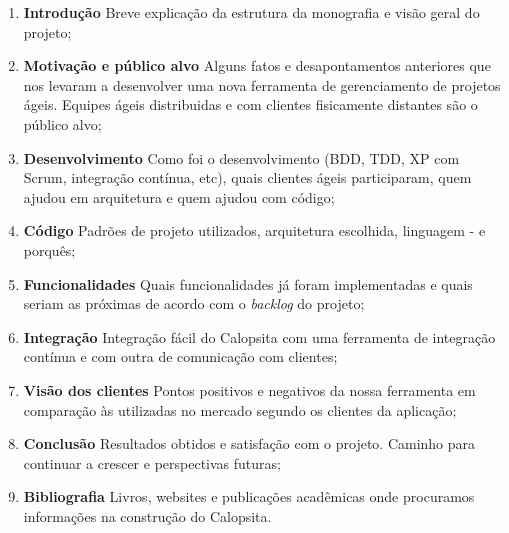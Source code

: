 \documentclass[titlepage]{article}
\begin{document}
\begin{enumerate}
	\item{\textbf{Introdução} Breve explicação da estrutura da monografia e visão geral do projeto;}
	\item{\textbf{Motivação e público alvo} Alguns fatos e desapontamentos anteriores que nos levaram a desenvolver uma nova ferramenta de gerenciamento de projetos ágeis. Equipes ágeis distribuidas e com clientes fisicamente distantes são o público alvo;}
	\item{\textbf{Desenvolvimento} Como foi o desenvolvimento (BDD, TDD, XP com Scrum, integração contínua, etc), quais clientes ágeis participaram, quem ajudou em arquitetura e quem ajudou com código;}
	\item{\textbf{Código} Padrões de projeto utilizados, arquitetura escolhida, linguagem - e porquês;}
	\item{\textbf{Funcionalidades} Quais funcionalidades já foram implementadas e quais seriam as próximas de acordo com o \textit{backlog} do projeto;}
	\item{\textbf{Integração} Integração fácil do Calopsita com uma ferramenta de integração contínua e com outra de comunicação com clientes;}
	\item{\textbf{Visão dos clientes} Pontos positivos e negativos da nossa ferramenta em comparação às utilizadas no mercado segundo os clientes da aplicação;}
	\item{\textbf{Conclusão} Resultados obtidos e satisfação com o projeto. Caminho para continuar a crescer e perspectivas futuras;}
	\item{\textbf{Bibliografia} Livros, websites e publicações acadêmicas onde procuramos informações na construção do Calopsita.}
\end{enumerate}
\end{document}
